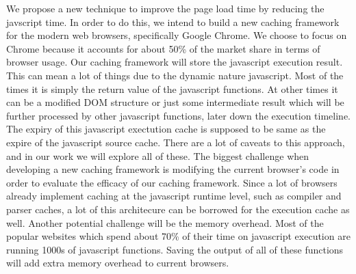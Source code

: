 We propose a new technique to improve the page load time by reducing the javscript time. %
In order to do this, we intend to build a new caching framework for the modern web browsers,
specifically Google Chrome. We choose to focus on Chrome because it accounts for about 50\% of the market share in terms of browser
usage. Our caching framework will store the javascript execution result. This can mean a lot of things
due to the dynamic nature javascript. Most of the times it is simply the return value of the 
javascript functions. At other times it can be a modified DOM structure or just some intermediate result which
will be further processed by other javascript functions, later down the execution timeline. 
The expiry of this javascript exectution cache is supposed to be same as the expire of the javascript source cache. %
There are a lot of caveats to this approach, and in our work we will explore all of these. %
The biggest challenge when developing a new caching framework is modifying the current browser's code 
in order to evaluate the efficacy of our caching framework. Since a lot of browsers already implement caching
at the javascript runtime level, such as compiler and parser caches, a lot of this architecure can be borrowed
for the execution cache as well. 
Another potential challenge will be the memory overhead. Most of the popular websites which spend about 70\% 
of their time on javascript execution are running 1000s of javascript functions. Saving the output of all 
of these functions will add extra memory overhead to current browsers. 
